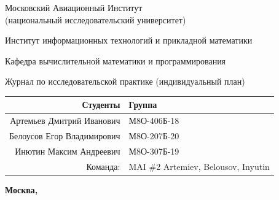 \documentclass[12pt]{article}
\begin{document}
\begin{titlepage}
\begin{center}
\bfseries

{\Large Московский Авиационный Институт\\ (национальный исследовательский университет)}

\vspace{36pt}

\large Институт информационных технологий и прикладной математики

\vspace{36pt}

\large Кафедра вычислительной математики и программирования

\vspace{48pt}

Журнал по исследовательской практике (индивидуальный план)

\end{center}

\vspace{120pt}

\begin{flushleft}
\begin{tabular}{|r|l|}
\hline
Студенты & Группа \\
\hline
Артемьев Дмитрий Иванович & М8О-406Б-18 \\
\hline
Белоусов Егор Владимирович & М8О-207Б-20 \\
\hline
Инютин Максим Андреевич & М8О-307Б-19 \\
\hline
Команда: & MAI \#2 Artemiev, Belousov, Inyutin \\
\hline
\end{tabular}
\end{flushleft}

\vspace*{\fill}

\begin{center}
\bfseries
Москва, \the\year
\end{center}
\end{titlepage}

\pagebreak
\end{document}
